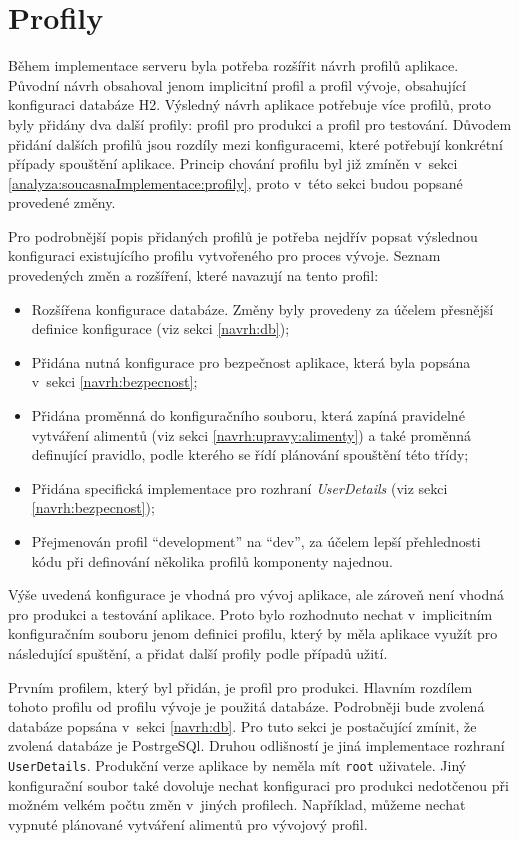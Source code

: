 \section{Profily}\label{navrh:profily}
    Během implementace serveru byla potřeba rozšířit návrh profilů aplikace. Původní návrh obsahoval jenom implicitní profil a profil vývoje, obsahující konfiguraci databáze H2. Výsledný návrh aplikace potřebuje více profilů, proto byly přidány dva další profily: profil pro produkci a profil pro testování. Důvodem přidání dalších profilů jsou rozdíly mezi konfiguracemi, které potřebují konkrétní případy spouštění aplikace. Princip chování profilu byl již zmíněn v~sekci \ref{analyza:soucasnaImplementace:profily}, proto v~této sekci budou popsané provedené změny.
    
    Pro podrobnější popis přidaných profilů je potřeba nejdřív popsat výslednou konfiguraci existujícího profilu vytvořeného pro proces vývoje. Seznam provedených změn a rozšíření, které navazují na tento profil:
    \begin{itemize}
            \setlength\itemsep{0.3em}
            \item Rozšířena konfigurace databáze. Změny byly provedeny za účelem přesnější definice konfigurace (viz sekci \ref{navrh:db});
            \item Přidána nutná konfigurace pro bezpečnost aplikace, která byla popsána v~sekci \ref{navrh:bezpecnost};
            \item Přidána proměnná do konfiguračního souboru, která zapíná pravidelné vytváření alimentů (viz sekci \ref{navrh:upravy:alimenty}) a také proměnná definující pravidlo, podle kterého se řídí plánování spouštění této třídy;
            \item Přidána specifická implementace pro rozhraní \textit{UserDetails} (viz sekci \ref{navrh:bezpecnost});
            \item Přejmenován profil \enquote{development} na \enquote{dev}, za účelem lepší přehlednosti kódu při definování několika profilů komponenty najednou.
    \end{itemize}
    
    Výše uvedená konfigurace je vhodná pro vývoj aplikace, ale zároveň není vhodná pro produkci a testování aplikace. Proto bylo rozhodnuto nechat v~implicitním konfiguračním souboru jenom definici profilu, který by měla aplikace využít pro následující spuštění, a přidat další profily podle případů užití.
    
    Prvním profilem, který byl přidán, je profil pro produkci. Hlavním rozdílem tohoto profilu od profilu vývoje je použitá databáze. Podrobněji bude zvolená databáze popsána v~sekci \ref{navrh:db}. Pro tuto sekci je postačující zmínit, že zvolená databáze je PostrgeSQl. Druhou odlišností je jiná implementace rozhraní \verb|UserDetails|. Produkční verze aplikace by neměla mít \verb|root| uživatele. Jiný konfigurační soubor také dovoluje nechat konfiguraci pro produkci nedotčenou při možném velkém počtu změn v~jiných profilech.
    Například, můžeme nechat vypnuté plánované vytváření alimentů pro vývojový profil.
    
